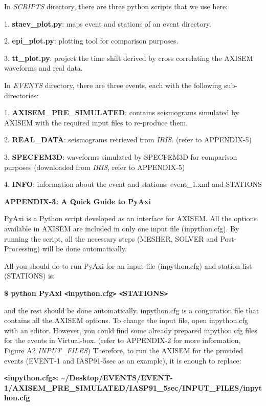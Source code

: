 \documentclass{article}
\begin{document}
\baselineskip=13pt
\leftskip=0pt
In \textit{SCRIPTS }directory, there are three python scripts that we use here:

1. \textbf{staev\_plot.py}: maps event and stations of an event directory.

2. \textbf{epi\_plot.py}: plotting tool for comparison purposes.

3.\textbf{ tt\_plot.py}: project the time shift derived by cross correlating the 
AXISEM waveforms and real data.

In \textit{EVENTS }directory, there are three events, each with the following sub-directories:

1. \textbf{AXISEM\_PRE\_SIMULATED}: contains seismograms simulated by AXISEM with 
the required input files to re-produce them.

2. \textbf{REAL\_DATA}: seismograms retrieved from \textit{IRIS. }(refer to APPENDIX-5)

3. \textbf{SPECFEM3D}: waveforms simulated by SPECFEM3D for comparison purposes 
(downloaded from\textit{ IRIS}, refer to APPENDIX-5)

4. \textbf{INFO}: information about the event and stations: event\_1.xml and STATIONS

{\large{}\textbf{APPENDIX-3: A Quick Guide to PyAxi}}

PyAxi is a Python script developed as an interface for AXISEM. All the options 
available in AXISEM are included in only one input file (inpython.cfg). By running 
the script, all the necessary steps (MESHER, SOLVER and Post-Processing) will be 
done automatically.

All you should do to run PyAxi for an input file (inpython.cfg) and station list 
(STATIONS) is:

\textbf{\$ python PyAxi \texttt{<}inpython.cfg\texttt{>} \texttt{<}STATIONS\texttt{>}}

and the rest should be done automatically. inpython.cfg is a conguration file that 
contains all the AXISEM options. To change the input file, open inpython.cfg with 
an editor. However, you could find some already prepared inpython.cfg files for 
the events in Virtual-box. (refer to APPENDIX-2 for more information, Figure A2 
\textit{INPUT\_FILES}) Therefore, to run the AXISEM for the provided events (EVENT-1 
and IASP91-5sec as an example), it is enough to replace:

\textbf{\texttt{<}inpython.cfg\texttt{>}: \textasciitilde{}/Desktop/EVENTS/EVENT-1/AXISEM\_PRE\_SIMULATED/IASP91\_5sec/INPUT\_FILES/inpython.cfg}
\end{document}
